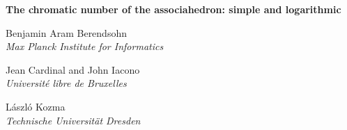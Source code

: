 \documentclass[a4paper]{article}
\begin{document}
\begin{center}
    
{ \bf \large
The chromatic number  of the associahedron: simple and logarithmic
}

\vspace{5pt}
Benjamin Aram Berendsohn \\
{\it Max Planck Institute for Informatics}

\vspace{5pt}
Jean Cardinal and
John Iacono \\ {\it Université libre de Bruxelles}

\vspace{5pt}
László Kozma \\{\it Technische Universität Dresden}\\%

\end{center}




\begin{abstract}
  Addario-Berry, Reed,  Scott, and Wood  (JoCG 2026) proved that the $n$-dimensional associahedron has chromatic number at most $22500\cdot\log_3 n+O(1)$. We present a much simpler proof that the chromatic number of the $n-1$-dimensional associahedron is at most $6 \log_2 n + 18$. Since this paper's appearance as a preliminary abstract in the Japan Conference on Discrete and Computational Geometry, Graphs, and Games held from September 7-10, 2026, the bound has been improved to $O(\log \log n)$ by Oum and Wood (arXiv September 30, 2026). It is hoped that the simple method here could give insights to further improvements.
\end{abstract}
\end{document}
